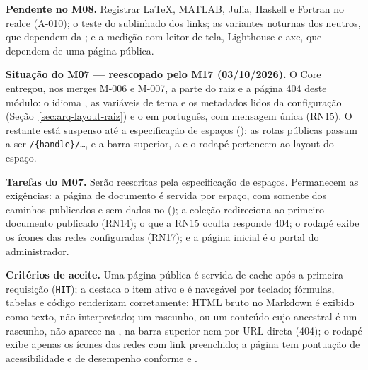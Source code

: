 \textbf{Pendente no M08.} Registrar LaTeX, MATLAB, Julia, Haskell e Fortran no realce (A-010); o teste do sublinhado dos links; as variantes noturnas dos neutros, que dependem da ; e a medição com leitor de tela, Lighthouse e axe, que dependem de uma página pública.

\textbf{Situação do M07 --- reescopado pelo M17 (03/10/2026).} O Core entregou, nos merges M-006 e M-007, a parte do  raiz e a página 404 deste módulo: o idioma , as variáveis de tema e os metadados lidos da configuração (Seção~\ref{sec:arq-layout-raiz}) e o  em português, com mensagem única (RN15). O restante está suspenso até a especificação de espaços (): as rotas públicas passam a ser \texttt{/\{handle\}/\ldots}, e a barra superior, a  e o rodapé pertencem ao layout do espaço.

\textbf{Tarefas do M07.} Serão reescritas pela especificação de espaços. Permanecem as exigências: a página de documento é servida por espaço, com  somente dos caminhos publicados e sem dados no  (); a coleção redireciona ao primeiro documento publicado (RN14); o que a RN15 oculta responde 404; o rodapé exibe os ícones das redes configuradas (RN17); e a página inicial \arq{/} é o portal do administrador.

\textbf{Critérios de aceite.} Uma página pública é servida de cache após a primeira requisição (\texttt{HIT}); a  destaca o item ativo e é navegável por teclado; fórmulas, tabelas e código renderizam corretamente; HTML bruto no Markdown é exibido como texto, não interpretado; um rascunho, ou um conteúdo cujo ancestral é um rascunho, não aparece na , na barra superior nem por URL direta (404); o rodapé exibe apenas os ícones das redes com link preenchido; a página tem pontuação de acessibilidade e de desempenho conforme  e .




